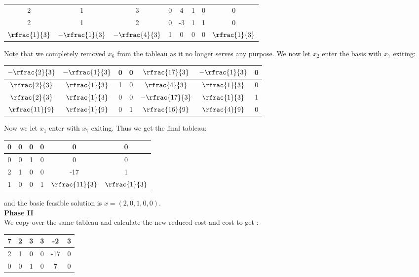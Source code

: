 \documentclass{article}
\begin{document}
\begin{jacklist}
\begin{center}
\begin{tabular}{|c|ccccccc|}
            2&1&3&0&4&1&0&0\\
            2&1&2&0&-3&1&1&0\\
            $\rfrac{1}{3}$&$-\rfrac{1}{3}$&$-\rfrac{4}{3}$&1&0&0&0&$\rfrac{1}{3}$ \\
            \hline
        \end{tabular}
    \end{center}
    Note that we completely removed $x_6$ from the tableau as it no longer serves any purpose. We now let $x_2$ enter the basis with
    $x_7$ exiting: 
    \begin{center}
        \begin{tabular}{|c|cccccc|}
            \hline
            $-\rfrac{2}{3}$&$-\rfrac{1}{3}$&0&0&$\rfrac{17}{3}$&$-\rfrac{1}{3}$&0\\
            \hline
            $\rfrac{2}{3}$&$\rfrac{1}{3}$&1&0&$\rfrac{4}{3}$&$\rfrac{1}{3}$&0\\
            $\rfrac{2}{3}$&$\rfrac{1}{3}$&0&0&$-\rfrac{17}{3}$&$\rfrac{1}{3}$&1\\
            $\rfrac{11}{9}$&$\rfrac{1}{9}$&0&1&$\rfrac{16}{9}$&$\rfrac{4}{9}$&0\\
            \hline
        \end{tabular}
    \end{center}
    Now we let $x_1$ enter with $x_7$ exiting. Thus we get the final tableau: 
    \begin{center}
        \begin{tabular}{|c|ccccc|}
            \hline
            0&0&0&0&0&0\\
            \hline
            0&0&1&0&0&0\\
            2&1&0&0&-17&1\\
            1&0&0&1&$\rfrac{11}{3}$&$\rfrac{1}{3}$\\
            \hline
        \end{tabular}
    \end{center}
    and the basic feasible solution is $x = (2,0,1,0,0)$. \\
    \textbf{Phase II} \\
    We copy over the same tableau and calculate the new reduced cost and cost to get :
    \begin{center}
        \begin{tabular}{|c|ccccc|}
            \hline
            7&2&3&3&-2&3\\
            \hline
            2&1&0&0&-17&0\\
            0&0&1&0&7&0\\

\end{tabular}
\end{center}
\end{jacklist}
\end{document}
